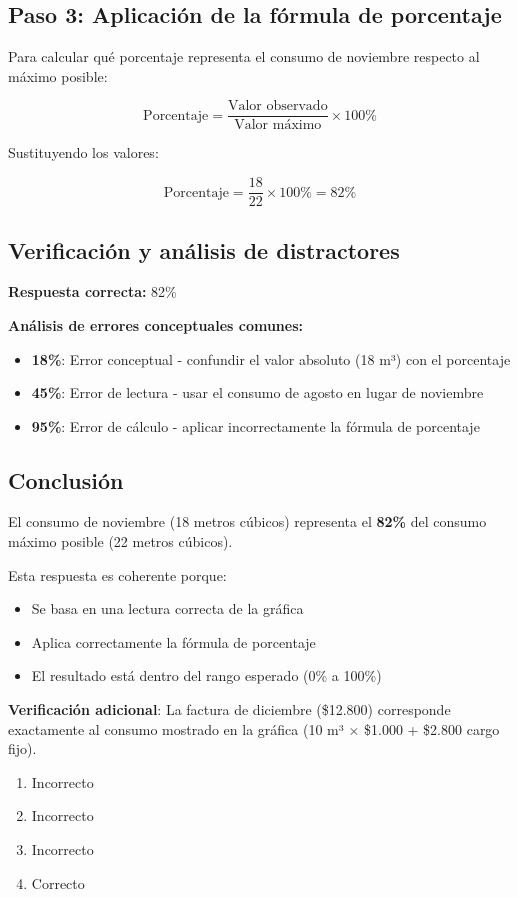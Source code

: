 \documentclass[a4paper]{article}
\newenvironment{solution}{}{}
\newenvironment{answerlist}{\begin{enumerate}}{\end{enumerate}}
\begin{document}
\begin{solution}
\subsection*{Paso 3: Aplicación de la fórmula de porcentaje}

Para calcular qué porcentaje representa el consumo de noviembre respecto al máximo posible:

$$\text{Porcentaje} = \frac{\text{Valor observado}}{\text{Valor máximo}} \times 100\%$$

Sustituyendo los valores:

$$\text{Porcentaje} = \frac{18}{22} \times 100\% = 82\%$$

\subsection*{Verificación y análisis de distractores}

\textbf{Respuesta correcta:} 82\%

\textbf{Análisis de errores conceptuales comunes:}\begin{itemize}\item \textbf{18\%}: Error conceptual - confundir el valor absoluto (18 m³) con el porcentaje
\item \textbf{45\%}: Error de lectura - usar el consumo de agosto en lugar de noviembre
\item \textbf{95\%}: Error de cálculo - aplicar incorrectamente la fórmula de porcentaje\end{itemize}
\subsection*{Conclusión}

El consumo de noviembre (18 metros cúbicos) representa el \textbf{82\%} del consumo máximo posible (22 metros cúbicos).

Esta respuesta es coherente porque:

\begin{itemize}
\item Se basa en una lectura correcta de la gráfica
\item Aplica correctamente la fórmula de porcentaje
\item El resultado está dentro del rango esperado (0\% a 100\%)
\end{itemize}

\textbf{Verificación adicional}: La factura de diciembre (\$12.800) corresponde exactamente al consumo mostrado en la gráfica (10 m³ $\times$ \$1.000 + \$2.800 cargo fijo).

\begin{answerlist}
  \item Incorrecto
  \item Incorrecto
  \item Incorrecto
  \item Correcto
\end{answerlist}\end{solution}
\end{document}
